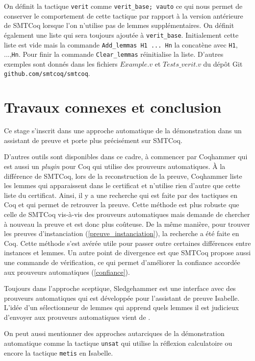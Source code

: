 \documentclass[11pt]{article}
\begin{document}
On définit la tactique \texttt{verit} comme \texttt{verit\_base; vauto} ce qui nous permet de conserver le comportement de cette tactique par rapport à la version antérieure de SMTCoq lorsque l'on n'utilise pas de lemmes supplémentaires. On définit également une liste qui sera toujours ajoutée à \texttt{verit\_base}. Initialement cette liste est vide mais la commande \texttt{Add\_lemmas H1\,...\,Hn} la concatène avec \texttt{H1}, ...,\texttt{Hn}. Pour finir la commande \texttt{Clear\_lemmas} réinitialise la liste. D'autres exemples sont donnés dans les fichiers $Example.v$ et $Tests\_verit.v$ du dépôt Git \texttt{github.com/smtcoq/smtcoq}.


\section{Travaux connexes et conclusion}

Ce stage s'inscrit dans une approche automatique de la démonstration dans un assistant de preuve et porte plus précisément sur SMTCoq. 

D'autres outils sont disponibles dans ce cadre, à commencer par Coqhammer \cite{coqhammer} qui est aussi un \textit{plugin} pour Coq qui utilise des prouveurs automatiques. À la différence de SMTCoq, lors de la reconstruction de la preuve, Coqhammer liste les lemmes qui apparaissent dans le certificat et n'utilise rien d'autre que cette liste du certificat. Ainsi, il y a une recherche qui est faite par des tactiques en Coq et qui permet de retrouver la preuve. Cette méthode est plus robuste que celle  de SMTCoq vis-à-vis des prouveurs automatiques mais demande de chercher à nouveau la preuve et est donc plus coûteuse. De la même manière, pour trouver les preuves d'instanciation (\ref{preuve_instanciation}), la recherche a été faite en Coq. Cette méthode s'est avérée utile pour passer outre certaines différences entre instances et lemmes. Un autre point de divergence est que SMTCoq propose aussi une commande de vérification, ce qui permet d'améliorer la confiance accordée aux prouveurs automatiques (\ref{confiance}).


Toujours dans l'approche sceptique, Sledgehammer \cite{sledgehammer_manual} est une interface avec des prouveurs automatiques qui est développée pour l'assistant de preuve Isabelle. L'idée d'un sélectionneur de lemmes qui apprend quels lemmes il est judicieux d'envoyer aux prouveurs automatiques \cite{hol_selector} vient de .

On peut aussi mentionner des approches autarciques de la démonstration automatique comme la tactique \texttt{unsat} \cite{smt_autarcique} qui utilise la réflexion calculatoire ou encore la tactique \texttt{metis} en Isabelle. \medbreak
\end{document}
